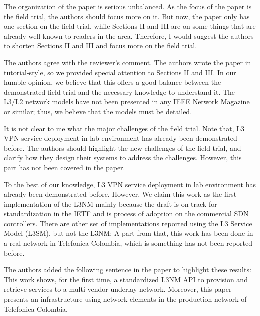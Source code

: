\documentclass[12pt]{journalrebuttal}
\begin{document}
\begin{revcomment}
The organization of the paper is serious unbalanced. As the focus of the paper is the field trial, the authors should focus more on it. But now, the paper only has one section on the field trial, while Sections II and III are on some things that are already well-known to readers in the area. Therefore, I would suggest the authors to shorten Sections II and III and focus more on the field trial.
\end{revcomment}

\begin{response}
The authors agree with the reviewer's comment. The authors wrote the paper in tutorial-style, so we provided special attention to Sections II and III. In our humble opinion, we believe that this offers a good balance between the demonstrated field trial and the necessary knowledge to understand it. The  L3/L2 network models have not been presented in any IEEE Network Magazine or similar; thus, we believe that the models must be detailed.
\end{response}

\begin{revcomment}
It is not clear to me what the major challenges of the field trial. Note that, L3 VPN service deployment in lab environment has already been demonstrated before. The authors should highlight the new challenges of the field trial, and clarify how they design their systems to address the challenges. However, this part has not been covered in the paper.
\end{revcomment}

\begin{response}
To the best of our knowledge, L3 VPN service deployment in lab environment has already been demonstrated before. However, We claim this work as the first implementation of the L3NM mainly because the draft is on track for standardization in the IETF and is process of adoption on the commercial SDN controllers. There are other set of implementations reported using the L3 Service Model (L3SM), but not the L3NM; A part from that, this work has been done in a real network in Telefonica Colombia, which is something has not been reported before. 

The authors added the following sentence in the paper to highlight these results: This work shows, for the first time, a standardized L3NM API to provision and retrieve services to a multi-vendor underlay network. Moreover, this paper presents an infrastructure using network elements in the production network of Telefonica Colombia.
\end{response}
\end{document}
